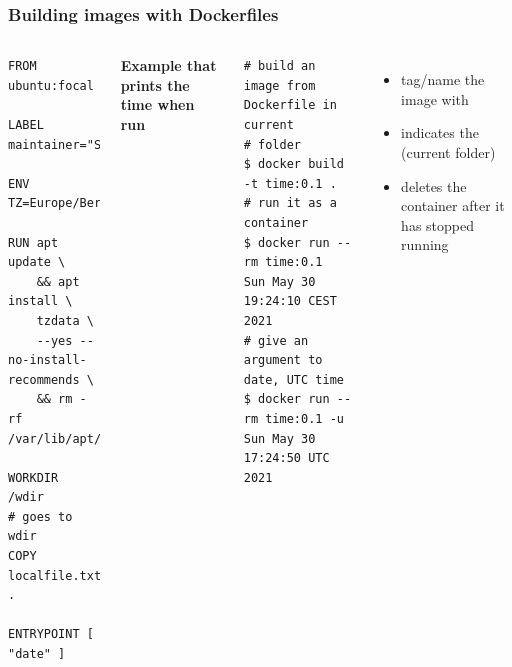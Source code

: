 \begin{frame}[fragile]
	\frametitle{Building images with Dockerfiles}
	
	\begin{columns}
		\begin{lstlisting}
FROM ubuntu:focal

LABEL maintainer="Someone"

ENV TZ=Europe/Berlin

RUN apt update \
	&& apt install \
	tzdata \
	--yes --no-install-recommends \
	&& rm -rf /var/lib/apt/lists/*

WORKDIR	/wdir
# goes to wdir
COPY localfile.txt .

ENTRYPOINT [ "date" ]
		\end{lstlisting}
	
		\textbf{Example that prints the time when run}
		\begin{lstlisting}
# build an image from Dockerfile in current
# folder
$ docker build -t time:0.1 .
# run it as a container
$ docker run --rm time:0.1
Sun May 30 19:24:10 CEST 2021
# give an argument to date, UTC time
$ docker run --rm time:0.1 -u
Sun May 30 17:24:50 UTC 2021
		\end{lstlisting}
	
	\begin{itemize}
		\item tag/name the image with 
		\item {} indicates the  (current folder)
		\item {} deletes the container after it has stopped running
	\end{itemize}
	\end{columns}
\end{frame}


